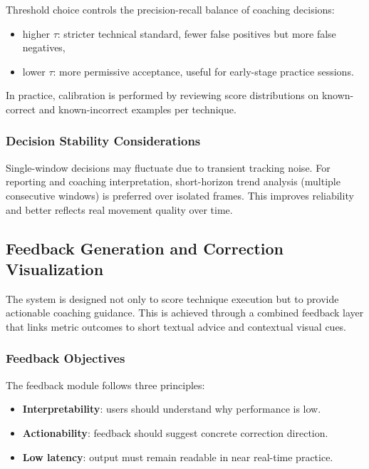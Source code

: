 \documentclass[12pt]{article}
\begin{document}
{Threshold choice controls the precision-recall balance of coaching decisions:
\begin{itemize}
    \item higher \(\tau\): stricter technical standard, fewer false positives but more false negatives,
    \item lower \(\tau\): more permissive acceptance, useful for early-stage practice sessions.
\end{itemize}

In practice, calibration is performed by reviewing score distributions on known-correct and known-incorrect examples per technique.

\subsubsection{Decision Stability Considerations}

Single-window decisions may fluctuate due to transient tracking noise. For reporting and coaching interpretation, short-horizon trend analysis (multiple consecutive windows) is preferred over isolated frames. This improves reliability and better reflects real movement quality over time.

\subsection{Feedback Generation and Correction Visualization}

The system is designed not only to score technique execution but to provide actionable coaching guidance. This is achieved through a combined feedback layer that links metric outcomes to short textual advice and contextual visual cues.

\subsubsection{Feedback Objectives}

The feedback module follows three principles:

\begin{itemize}
    \item \textbf{Interpretability}: users should understand why performance is low.
    \item \textbf{Actionability}: feedback should suggest concrete correction direction.
    \item \textbf{Low latency}: output must remain readable in near real-time practice.
\end{itemize}

}
\end{document}
